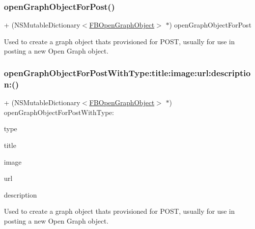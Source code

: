 \subsubsection{\texorpdfstring{open\+Graph\+Object\+For\+Post()}{openGraphObjectForPost()}\hspace{0.1cm}{\footnotesize\ttfamily [5/5]}}
{\footnotesize\ttfamily + (N\+S\+Mutable\+Dictionary$<$\hyperlink{protocolFBOpenGraphObject-p}{F\+B\+Open\+Graph\+Object}$>$ $\ast$) open\+Graph\+Object\+For\+Post \begin{DoxyParamCaption}{ }\end{DoxyParamCaption}}

Used to create a graph object that\textquotesingle{}s provisioned for P\+O\+ST, usually for use in posting a new Open Graph object. \mbox{\label{interfaceFBGraphObject_ad8c6af9938313eafd419342903a15f25}} 
\subsubsection{\texorpdfstring{open\+Graph\+Object\+For\+Post\+With\+Type\+:title\+:image\+:url\+:description\+:()}{openGraphObjectForPostWithType:title:image:url:description:()}\hspace{0.1cm}{\footnotesize\ttfamily [1/5]}}
{\footnotesize\ttfamily + (N\+S\+Mutable\+Dictionary$<$\hyperlink{protocolFBOpenGraphObject-p}{F\+B\+Open\+Graph\+Object}$>$ $\ast$) open\+Graph\+Object\+For\+Post\+With\+Type\+: \begin{DoxyParamCaption}\item[{(N\+S\+String $\ast$)}]{type }\item[{title:(N\+S\+String $\ast$)}]{title }\item[{image:(id)}]{image }\item[{url:(id)}]{url }\item[{description:(N\+S\+String $\ast$)}]{description }\end{DoxyParamCaption}}

Used to create a graph object that\textquotesingle{}s provisioned for P\+O\+ST, usually for use in posting a new Open Graph object.


